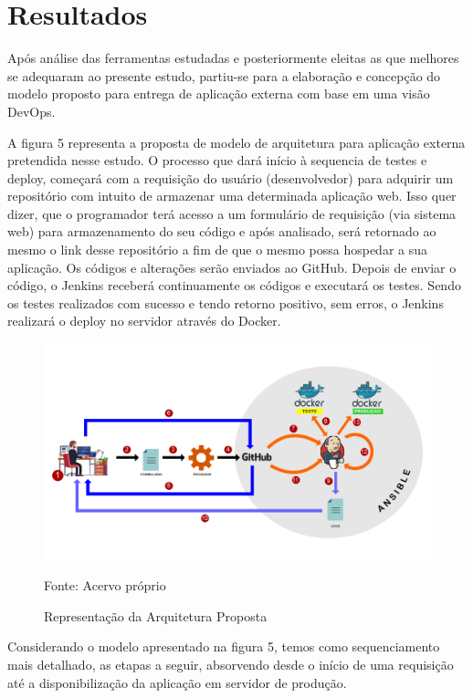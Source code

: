 \chapter{Resultados}\label{cap:resultados}

Após análise das ferramentas estudadas e posteriormente eleitas as que melhores se adequaram ao presente estudo, partiu-se para a elaboração e concepção do modelo proposto para entrega de aplicação externa com base em uma visão DevOps.

A figura 5 representa a proposta de modelo de arquitetura para aplicação externa pretendida nesse estudo. O processo que dará início à sequencia de testes e deploy, começará com a requisição do usuário (desenvolvedor) para adquirir um repositório com intuito de armazenar uma determinada aplicação web. Isso quer dizer, que o programador terá acesso a um formulário de requisição (via sistema web) para armazenamento do seu código e após analisado, será retornado ao mesmo o link desse repositório a fim de que o mesmo possa hospedar a sua aplicação. Os códigos e alterações serão enviados ao GitHub. Depois de enviar o código, o Jenkins receberá continuamente os códigos e executará os testes. Sendo os testes realizados com sucesso e tendo retorno positivo, sem erros, o Jenkins realizará o deploy no servidor através do Docker.

\begin{figure} [htb]
	\centering
	\includegraphics[width=1.05\linewidth]{imagens/MODELODEPLOY}
\caption{Representação da Arquitetura Proposta}
Fonte: Acervo próprio
	\label{fig:modelodeploy}
\end{figure}


Considerando o modelo apresentado na figura 5, temos como sequenciamento mais detalhado, as etapas a seguir, absorvendo desde o início de uma requisição até a disponibilização da aplicação em servidor de produção.


